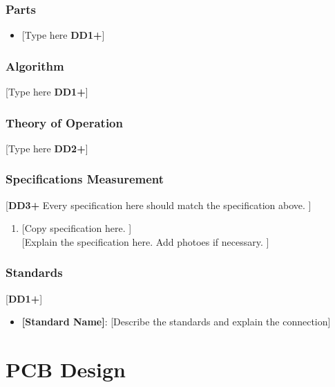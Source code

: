 \documentclass[letterpaper, 11pt]{article}
\begin{document}
\subsubsection{Parts}
\begin{itemize}
    \item {[Type here \textbf{DD1+}]}
\end{itemize}

\subsubsection{Algorithm}
[Type here \textbf{DD1+}]

\subsubsection{Theory of Operation}
[Type here \textbf{DD2+}]

\subsubsection{Specifications Measurement}
[\textbf{DD3+} Every specification here should match the specification above. ]
\begin{enumerate}
    \item {[Copy specification here. ]} \\
          {[Explain the specification here. Add photoes if necessary. ]}
\end{enumerate}

\subsubsection{Standards}
[\textbf{DD1+}]
\begin{itemize}
    \item \textbf{[Standard Name]}: [Describe the standards and explain the connection]
\end{itemize}

\clearpage
\section{PCB Design}
\end{document}
